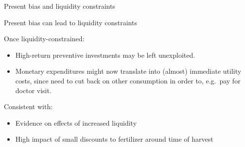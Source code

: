 \documentclass[aspectratio=169, 10pt, handout]{beamer}
\newenvironment{wideitemize}{\itemize\addtolength{\itemsep}{10pt}}{\enditemize}
\begin{document}
\begin{frame}{Present bias and liquidity constraints}

\begin{wideitemize}

	\item Present bias can lead to liquidity constraints \citep{angeletos2001hyperbolic}
	
	\item Once liquidity-constrained:

	\begin{itemize}
	
		\item High-return preventive investments may be left unexploited.
		
		\item Monetary expenditures might now translate into (almost) immediate utility costs, since need to cut back on other consumption in order to, e.g.\ pay for doctor visit.

	\end{itemize}
	
	\item Consistent with:

	\begin{itemize}

		\item Evidence on effects of increased liquidity \citep{dupas2013savings}
		
		\item High impact of small discounts to fertilizer around time of harvest \citep{duflo2011nudging}
		
	\end{itemize}

\end{wideitemize}

\end{frame}
\end{document}
